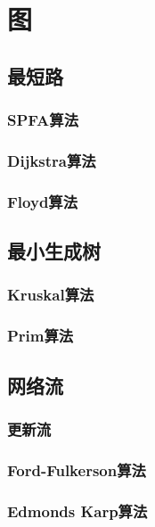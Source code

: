\section{图}
\subsection{最短路}
\subsubsection{SPFA算法}

\subsubsection{Dijkstra算法}

\subsubsection{Floyd算法}


\subsection{最小生成树}
\subsubsection{Kruskal算法}

\subsubsection{Prim算法}


\subsection{网络流}
\subsubsection{更新流}

\subsubsection{Ford-Fulkerson算法}

\subsubsection{Edmonds Karp算法}


